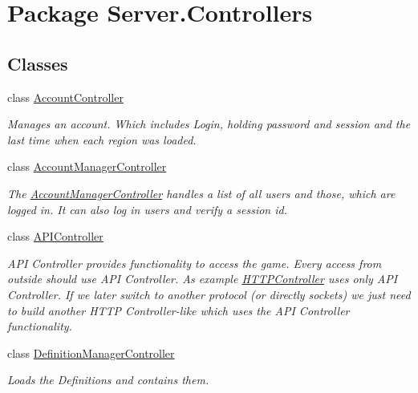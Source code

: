 \hypertarget{namespaceServer_1_1Controllers}{\section{Package Server.\-Controllers}
\label{namespaceServer_1_1Controllers}
}
\subsection*{Classes}
\begin{DoxyCompactItemize}
\item 
class \hyperlink{classServer_1_1Controllers_1_1AccountController}{Account\-Controller}
\begin{DoxyCompactList}\small\item\em Manages an account. Which includes Login, holding password and session and the last time when each region was loaded. \end{DoxyCompactList}\item 
class \hyperlink{classServer_1_1Controllers_1_1AccountManagerController}{Account\-Manager\-Controller}
\begin{DoxyCompactList}\small\item\em The \hyperlink{classServer_1_1Controllers_1_1AccountManagerController}{Account\-Manager\-Controller} handles a list of all users and those, which are logged in. It can also log in users and verify a session id. \end{DoxyCompactList}\item 
class \hyperlink{classServer_1_1Controllers_1_1APIController}{A\-P\-I\-Controller}
\begin{DoxyCompactList}\small\item\em A\-P\-I Controller provides functionality to access the game. Every access from outside should use A\-P\-I Controller. As example \hyperlink{classServer_1_1Controllers_1_1HTTPController}{H\-T\-T\-P\-Controller} uses only A\-P\-I Controller. If we later switch to another protocol (or directly sockets) we just need to build another H\-T\-T\-P Controller-\/like which uses the A\-P\-I Controller functionality. \end{DoxyCompactList}\item 
class \hyperlink{classServer_1_1Controllers_1_1DefinitionManagerController}{Definition\-Manager\-Controller}
\begin{DoxyCompactList}\small\item\em Loads the Definitions and contains them. \end{DoxyCompactList}\item 

\end{DoxyCompactItemize}
